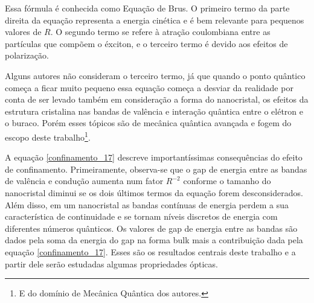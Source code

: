 \par Essa fórmula é conhecida como Equação de Brus. O primeiro termo da parte direita da equação representa a energia cinética e é bem relevante para pequenos valores de $R$. O segundo termo se refere à atração coulombiana entre as partículas que compõem o éxciton, e o terceiro termo é devido aos efeitos de polarização.

\par Alguns autores\cite{confinamento4}\cite{confinamento5} não consideram o terceiro termo, já que quando o ponto quântico começa a ficar muito pequeno essa equação começa a desviar da realidade por conta de ser levado também em consideração a forma do nanocristal, os efeitos da estrutura cristalina nas bandas de valência e interação quântica entre o elétron e o buraco. Porém  esses tópicos são de mecânica quântica avançada e fogem do escopo deste trabalho\footnote{E do domínio de Mecânica Quântica dos autores.}. 

\par A equação \eqref{confinamento_17} descreve importantíssimas consequências do efeito de confinamento. Primeiramente, observa-se que o gap de energia entre as bandas de valência e condução aumenta num fator $R^{-2}$ conforme o tamanho do nanocristal diminui se os dois últimos termos da equação forem desconsiderados. Além disso, em um nanocristal as bandas contínuas de energia perdem a sua característica de continuidade e se tornam níveis discretos de energia com diferentes números quânticos. Os valores de gap de energia entre as bandas são dados pela soma da energia do gap na forma bulk mais a contribuição dada pela equação \eqref{confinamento_17}. Esses são os resultados centrais deste trabalho e a partir dele serão estudadas algumas propriedades ópticas.